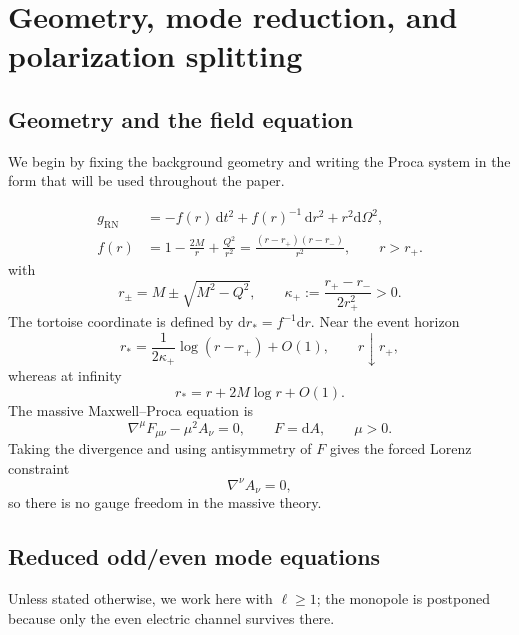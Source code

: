 \documentclass[12pt]{article}
\numberwithin{equation}{section}
\theoremstyle{plain}
\theoremstyle{definition}
\theoremstyle{remark}
\newcommand{\RN}{\mathrm{RN}}
\newcommand{\dd}{\mathrm d}
\begin{document}
\section{Geometry, mode reduction, and polarization splitting}\label{sec:reduction}

\subsection{Geometry and the field equation}

We begin by fixing the background geometry and writing the Proca system in the form that will be used throughout the paper.

\begin{equation}\label{eq:rn_metric}
\begin{aligned}
   g_{\RN}
   &=
   -f(r)\,\dd t^2
   +f(r)^{-1}\,\dd r^2
   +r^2\dd\Omega^2,
\\
   f(r)&=1-\frac{2M}{r}+\frac{Q^2}{r^2}
   =
   \frac{(r-r_+)(r-r_-)}{r^2},
   \qquad
   r>r_+.
\end{aligned}
\end{equation}
with
\[
   r_\pm=M\pm\sqrt{M^2-Q^2},
   \qquad
   \kappa_+:=\frac{r_+-r_-}{2r_+^2}>0.
\]
The tortoise coordinate is defined by $\dd r_*=f^{-1}\dd r$.  Near the event horizon
\begin{equation}\label{eq:rn_tortoise_horizon}
   r_*
   =
   \frac{1}{2\kappa_+}\log(r-r_+)+O(1),
   \qquad r\downarrow r_+,
\end{equation}
whereas at infinity
\begin{equation}\label{eq:rn_tortoise_infty}
   r_*=r+2M\log r+O(1).
\end{equation}
The massive Maxwell--Proca equation is
\begin{equation}\label{eq:proca_covariant}
   \nabla^\mu F_{\mu\nu}-\mu^2A_\nu=0,
   \qquad
   F=\dd A,
   \qquad
   \mu>0.
\end{equation}
Taking the divergence and using antisymmetry of $F$ gives the forced Lorenz constraint
\begin{equation}\label{eq:forced_lorenz}
   \nabla^\nu A_\nu=0,
\end{equation}
so there is no gauge freedom in the massive theory.

\subsection{Reduced odd/even mode equations}

Unless stated otherwise, we work here with $\ell\ge1$; the monopole is postponed because only the even electric channel survives there.
\end{document}
